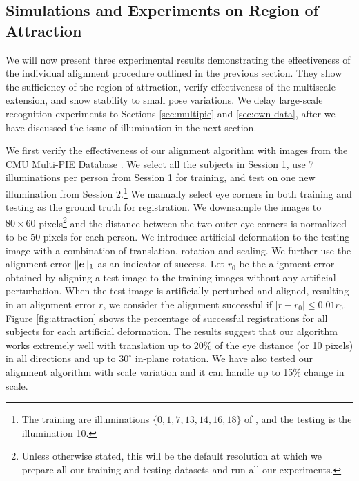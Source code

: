\documentclass[12pt,journal,draftcls,letterpaper,onecolumn]{IEEEtran}
\providecommand{\DIFadd}[1]{{\protect\color{blue}\uwave{#1}}} %
\providecommand{\DIFaddbegin}{} %
\providecommand{\DIFaddend}{} %
\providecommand{\DIFdelbegin}{} %
\providecommand{\DIFdelend}{} %
\begin{document}
\subsection{Simulations and Experiments on Region of
Attraction} We will now present three experimental results
demonstrating the effectiveness of the individual alignment
procedure outlined in the previous section. They show the sufficiency of the
region of attraction, verify effectiveness of the multiscale extension,
and show stability to small pose variations.  We delay large-scale recognition experiments
to Sections \ref{sec:multipie} and \ref{sec:own-data}, after we
have discussed the issue of illumination in the next section.
\DIFdelbegin %
\DIFdelend 

\DIFdelbegin %
\DIFdelend \DIFaddbegin \noindent {\DIFadd{1) }\em \DIFadd{2D Deformation.}}  \DIFaddend We first verify the
    effectiveness of our alignment algorithm with images
    from the CMU Multi-PIE Database \cite{Gross2008-FGR}.
    We select all the subjects in Session 1, use 7
    illuminations per person from Session 1 for training,
    and test on one new illumination from Session
    2.\footnote{The training are illuminations $\{0, 1, 7,
    13, 14, 16, 18\}$ of \cite{Gross2008-FGR}, and the
    testing is the illumination 10. } We manually select
    eye corners in both training and testing as the ground
    truth for registration. We downsample the images to
    $80\times 60$ pixels\footnote{Unless otherwise stated,
    this will be the default resolution at which we prepare
    all our training and testing datasets and run all our
    experiments.} and the distance between the two outer
    eye corners is normalized to be 50 pixels for each
    person. We introduce artificial deformation to the
    testing image with a combination of translation,
    rotation and scaling. We further use the alignment
    error $\|\boldsymbol{e}\|_1$ as an indicator of success. Let $r_0$
    be the alignment error obtained by aligning a test
    image to the training images without any artificial
    perturbation. When the test image is artificially
    perturbed and aligned, resulting in an alignment error
    $r$, we consider the alignment successful if $|r - r_0 | \leq
    0.01r_0$. Figure \ref{fig:attraction} shows the
    percentage of successful registrations for all subjects
    for each artificial deformation. The results suggest
    that our algorithm works extremely well with
    translation up to 20\% of the eye distance (or 10
    pixels) in all directions and up to $30^\circ$ in-plane
    rotation. We have also tested our alignment algorithm
    with scale variation and it can handle up to 15\%
    change in scale.
\end{document}

